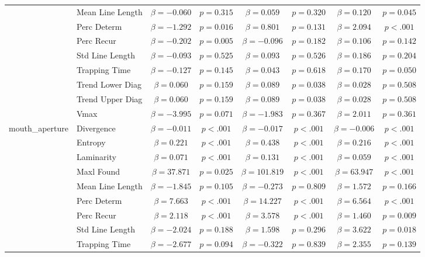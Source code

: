 \begin{tabular}{llcc|cc|cc}
 & Mean Line Length & $\beta = -0.060$ & $p = 0.315$ & $\beta = 0.059$ & $p = 0.320$ & $\beta = 0.120$ & $p = 0.045$ \\
 & Perc Determ & $\beta = -1.292$ & $p = 0.016$ & $\beta = 0.801$ & $p = 0.131$ & $\beta = 2.094$ & $p < .001$ \\
 & Perc Recur & $\beta = -0.202$ & $p = 0.005$ & $\beta = -0.096$ & $p = 0.182$ & $\beta = 0.106$ & $p = 0.142$ \\
 & Std Line Length & $\beta = -0.093$ & $p = 0.525$ & $\beta = 0.093$ & $p = 0.526$ & $\beta = 0.186$ & $p = 0.204$ \\
 & Trapping Time & $\beta = -0.127$ & $p = 0.145$ & $\beta = 0.043$ & $p = 0.618$ & $\beta = 0.170$ & $p = 0.050$ \\
 & Trend Lower Diag & $\beta = 0.060$ & $p = 0.159$ & $\beta = 0.089$ & $p = 0.038$ & $\beta = 0.028$ & $p = 0.508$ \\
 & Trend Upper Diag & $\beta = 0.060$ & $p = 0.159$ & $\beta = 0.089$ & $p = 0.038$ & $\beta = 0.028$ & $p = 0.508$ \\
 & Vmax & $\beta = -3.995$ & $p = 0.071$ & $\beta = -1.983$ & $p = 0.367$ & $\beta = 2.011$ & $p = 0.361$ \\
\midrule
\multirow{12}{*}{mouth_aperture} & Divergence & $\beta = -0.011$ & $p < .001$ & $\beta = -0.017$ & $p < .001$ & $\beta = -0.006$ & $p < .001$ \\
 & Entropy & $\beta = 0.221$ & $p < .001$ & $\beta = 0.438$ & $p < .001$ & $\beta = 0.216$ & $p < .001$ \\
 & Laminarity & $\beta = 0.071$ & $p < .001$ & $\beta = 0.131$ & $p < .001$ & $\beta = 0.059$ & $p < .001$ \\
 & Maxl Found & $\beta = 37.871$ & $p = 0.025$ & $\beta = 101.819$ & $p < .001$ & $\beta = 63.947$ & $p < .001$ \\
 & Mean Line Length & $\beta = -1.845$ & $p = 0.105$ & $\beta = -0.273$ & $p = 0.809$ & $\beta = 1.572$ & $p = 0.166$ \\
 & Perc Determ & $\beta = 7.663$ & $p < .001$ & $\beta = 14.227$ & $p < .001$ & $\beta = 6.564$ & $p < .001$ \\
 & Perc Recur & $\beta = 2.118$ & $p < .001$ & $\beta = 3.578$ & $p < .001$ & $\beta = 1.460$ & $p = 0.009$ \\
 & Std Line Length & $\beta = -2.024$ & $p = 0.188$ & $\beta = 1.598$ & $p = 0.296$ & $\beta = 3.622$ & $p = 0.018$ \\
 & Trapping Time & $\beta = -2.677$ & $p = 0.094$ & $\beta = -0.322$ & $p = 0.839$ & $\beta = 2.355$ & $p = 0.139$ \\

\end{tabular}
